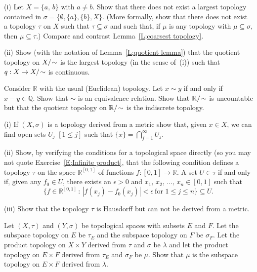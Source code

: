 \begin{problem}\label{E;quotient remarks}
(i) Let $X=\{a,\,b\}$ with $a\neq b$. Show that there
does not exist a largest topology contained in
$\sigma=\{\emptyset,\{a\},\{b\},X\}$. (More formally,
show that there does not exist a topology $\tau$
on $X$ such that $\tau\subseteq \sigma$ and
such that, if $\mu$ is any topology with $\mu\subseteq\sigma$,
then $\mu\subseteq \tau$.) Compare and contrast
Lemma~\ref{L;coarsest topology}.

(ii) Show (with the notation of Lemma~\ref{L;quotient lemma})
that the quotient topology on $X/\negthinspace\sim$ is the largest
topology (in the sense of~(i)) such that
$q:X\rightarrow X/\negthinspace\sim$ is continuous.
\end{problem}
\begin{problem}\label{E;quotient non Hausdorff}
Consider ${\mathbb R}$ with the usual (Euclidean)
topology. Let $x\sim y$ if and only if $x-y\in{\mathbb Q}$.
Show that $\sim$ is an equivalence relation. Show that
${\mathbb R}/\negthinspace\sim$ is uncountable but that the quotient
topology on ${\mathbb R}/\negthinspace\sim$ is the indiscrete topology.
\end{problem}
\begin{problem}\label{E;Hausdorff not metric}
(i) If $(X,\sigma)$ is a topology derived from a metric
show that, given $x\in X$, we can find open sets
$U_{j}$ $[1\leq j]$
such that $\{x\}=\bigcap_{j=1}^{\infty}U_{j}$.

(ii) Show, by verifying the conditions for a topological
space directly (so you may not quote Exercise~\ref{E;Infinite product},
that the following condition defines
a topology $\tau$
on the space ${\mathbb R}^{[0,1]}$ of functions $f:[0,1]\rightarrow{\mathbb R}$.
A set $U\in\tau$ if and only if, given any $f_{0}\in U$,
there exists an $\epsilon>0$
and $x_{1},\,x_{2},\,\dots,\,x_{n}\in[0,1]$ such that
\[\{f\in {\mathbb R}^{[0,1]}\,:\,
|f(x_{j})-f_{0}(x_{j})|<\epsilon\ \text{for $1\leq j\leq n$}\}\subseteq U.\]

(iii) Show that the topology $\tau$ is Hausdorff
but can not be derived from a metric.
\end{problem}
\begin{problem}\label{E;Product subspace}
Let $(X,\tau)$ and $(Y,\sigma)$ be topological spaces
with subsets $E$ and $F$. Let the subspace topology
on $E$ be $\tau_{E}$ and  the subspace topology
on $F$ be $\sigma_{F}$. Let the product topology
on $X\times Y$ derived from $\tau$ and $\sigma$
be $\lambda$ and let the product topology
on $E\times F$ derived from $\tau_{E}$ and $\sigma_{F}$
be $\mu$. Show that $\mu$ is the subspace topology on $E\times F$
derived from $\lambda$.
\end{problem}
